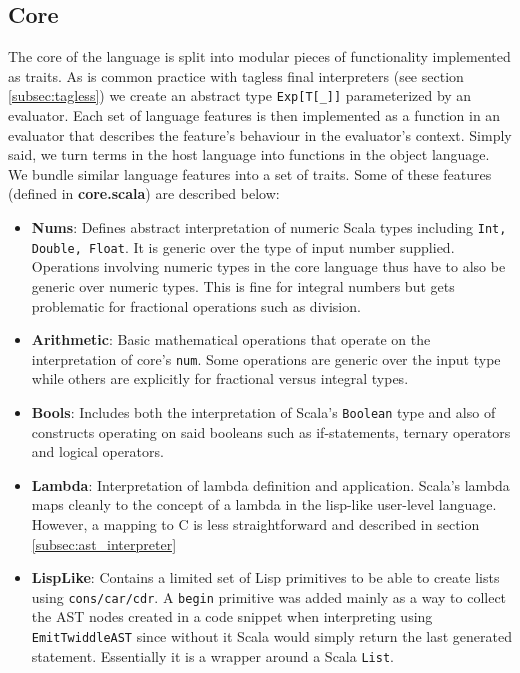 \documentclass{article}
\begin{document}
\subsection{Core}
The core of the language is split into modular pieces of functionality implemented as traits. As is common practice with tagless final interpreters (see section \ref{subsec:tagless}) we create an abstract type \texttt{Exp[T[\_]]} parameterized by an evaluator. Each set of language features is then implemented as a function in an evaluator that describes the feature's behaviour in the evaluator's context. Simply said, we turn terms in the host language into functions in the object language. We bundle similar language features into a set of traits. Some of these features (defined in \textbf{core.scala}) are described below:
\begin{itemize}
	\item \textbf{Nums}: Defines abstract interpretation of numeric Scala types including \texttt{Int, Double, Float}. It is generic over the type of input number supplied. Operations involving numeric types in the core language thus have to also be generic over numeric types. This is fine for integral numbers but gets problematic for fractional operations such as division.
	\item \textbf{Arithmetic}: Basic mathematical operations that operate on the interpretation of core's \texttt{num}. Some operations are generic over the input type while others are explicitly for fractional versus integral types.
	\item \textbf{Bools}: Includes both the interpretation of Scala's \texttt{Boolean} type and also of constructs operating on said booleans such as if-statements, ternary operators and logical operators.
	\item \textbf{Lambda}: Interpretation of lambda definition and application. Scala's lambda maps cleanly to the concept of a lambda in the lisp-like user-level language. However, a mapping to C is less straightforward and described in section \ref{subsec:ast_interpreter}
	\item \textbf{LispLike}: Contains a limited set of Lisp primitives to be able to create lists using \texttt{cons/car/cdr}. A \texttt{begin} primitive was added mainly as a way to collect the AST nodes created in a code snippet when interpreting using \texttt{EmitTwiddleAST} since without it Scala would simply return the last generated statement. Essentially it is a wrapper around a Scala \texttt{List}.
\end{itemize}
\end{document}
